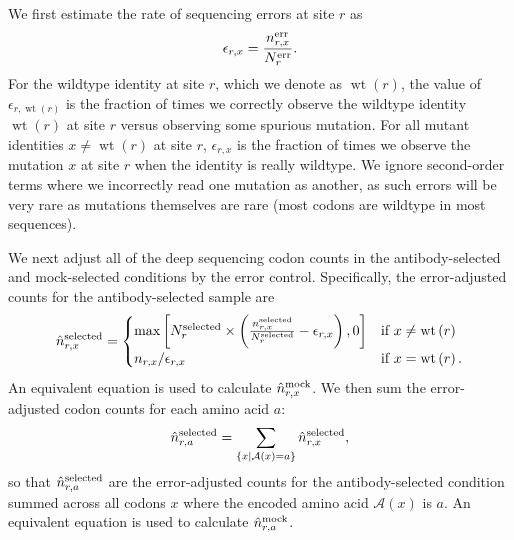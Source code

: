 \documentclass[11pt]{article}
\begin{document}
We first estimate the rate of sequencing errors at site $r$ as
\begin{equation}
\label{eq:epsilonrx}
\epsilon_{r,x} = \frac{n_{r,x}^{\rm{err}}}{N_{r}^{\rm{err}}}.
\end{equation}
For the wildtype identity at site $r$, which we denote as $\operatorname{wt}\left(r\right)$, the value of $\epsilon_{r,\operatorname{wt}\left(r\right)}$ is the fraction of times we correctly observe the wildtype identity $\operatorname{wt}\left(r\right)$ at site $r$ versus observing some spurious mutation. 
For all mutant identities $x \ne \operatorname{wt}\left(r\right)$ at site $r$, $\epsilon_{r,x}$ is the fraction of times we observe the mutation $x$ at site $r$ when the identity is really wildtype.
We ignore second-order terms where we incorrectly read one mutation as another, as such errors will be very rare as mutations themselves are rare (most codons are wildtype in most sequences). 

We next adjust all of the deep sequencing codon counts in the antibody-selected and mock-selected conditions by the error control. 
Specifically, the error-adjusted counts for the antibody-selected sample are
\begin{equation}
\label{eq:erroradjust}
\hat{n}_{r,x} ^{\rm{selected}}= \begin{cases}
\max\left[N_r^{\rm{selected}} \times \left(\frac{n_{r,x}^{\rm{selected}}}{N_r^{\rm{selected}}} - \epsilon_{r,x}\right), 0\right] & \mbox{if } x \ne \operatorname{wt}\left(r\right) \\
n_{r,x} / \epsilon_{r,x} & \mbox{if } x = \operatorname{wt}\left(r\right).
\end{cases}
\end{equation}
An equivalent equation is used to calculate $\hat{n}_{r,x} ^{\rm{mock}}$.
We then sum the error-adjusted codon counts for each amino acid $a$:
\begin{equation}
\hat{n}_{r,a}^{\rm{selected}} = \sum\limits_{\left\{x \mid \mathcal{A}\left(x\right) = a\right\}} \hat{n}_{r,x}^{\rm{selected}},
\end{equation}
so that $\hat{n}_{r,a}^{\rm{selected}}$ are the error-adjusted counts for the antibody-selected condition summed across all codons $x$ where the encoded amino acid $\mathcal{A}\left(x\right)$ is $a$.
An equivalent equation is used to calculate $\hat{n}_{r,a} ^{\rm{mock}}$.
\end{document}
